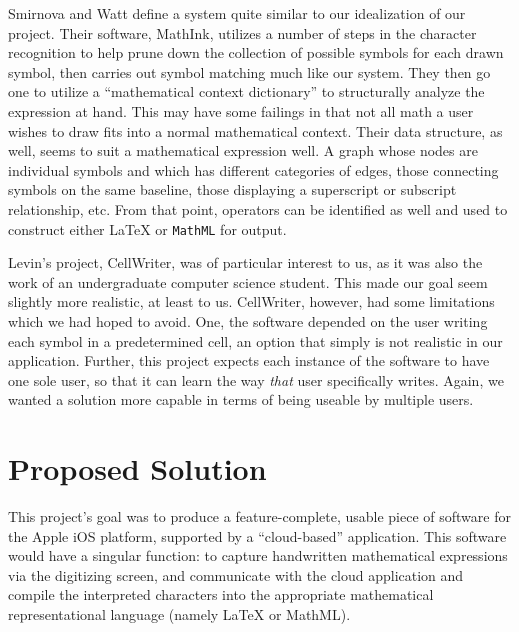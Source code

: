 \documentclass{acm_proc_article-sp}
\begin{document}
Smirnova and Watt\cite{smirnova_pen-based_2006} define a system quite similar to our idealization of our project. Their software, MathInk, utilizes a number of steps in the character recognition to help prune down the collection of possible symbols for each drawn symbol, then carries out symbol matching much like our system. They then go one to utilize a ``mathematical context dictionary'' to structurally analyze the expression at hand. This may have some failings in that not all math a user wishes to draw fits into a normal mathematical context. Their data structure, as well, seems to suit a mathematical expression well. A graph whose nodes are individual symbols and which has different categories of edges, those connecting symbols on the same baseline, those displaying a superscript or subscript relationship, etc. From that point, operators can be identified as well and used to construct either \LaTeX{} or \texttt{MathML} for output.

Levin's project, CellWriter, was of particular interest to us, as it was also the work of an undergraduate computer science student. This made our goal seem slightly more realistic, at least to us. CellWriter, however, had some limitations which we had hoped to avoid. One, the software depended on the user writing each symbol in a predetermined cell, an option that simply is not realistic in our application. Further, this project expects each instance of the software to have one sole user, so that it can learn the way \emph{that} user specifically writes. Again, we wanted a solution more capable in terms of being useable by multiple users.

\section{Proposed Solution}
This project's goal was to produce a feature-complete, usable piece of software for the Apple iOS platform, supported by a ``cloud-based'' application. This software would have a singular function: to capture handwritten mathematical expressions via the digitizing screen, and communicate with the cloud application and compile the interpreted characters into the appropriate mathematical representational language (namely \LaTeX{} or MathML).
\end{document}
